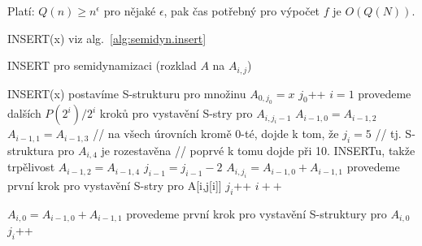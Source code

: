 Platí: $Q(n) \geq n^{\epsilon}$ pro nějaké $\epsilon$, pak čas potřebný pro
výpočet $f$ je $O(Q(N))$.

INSERT(x) viz alg.~\ref{alg:semidyn.insert}



\begin{algorithm}[!htb]
\caption{INSERT pro semidynamizaci (rozklad $A$ na $A_{i,j}$)}
\label{alg:semidyn.insert.vylepseny}
\begin{algorithmic}
\STATE INSERT(x)
  \STATE postavíme S-strukturu pro množinu $A_{0,j_0}={x}$
  \STATE $j_0$++
  \STATE $i=1$
      \STATE provedeme dalších $P(2^i)/2^i$ kroků pro vystavění 
      	S-stry pro $A_{i,j_i-1}$
        \STATE $A_{i-1,0}=A_{i-1,2}$
        \STATE $A_{i-1,1}=A_{i-1,3}$
          \STATE // na všech úrovních kromě 0-té, dojde k tom, že $j_i=5$
	  \STATE // tj. S-struktura pro $A_{i,4}$ je rozestavěna
          \STATE // poprvé k tomu dojde při 10. INSERTu, takže trpělivost
	  \STATE $A_{i-1,2}=A_{i-1,4}$
	\ENDIF
        \STATE $j_{i-1}=j_{i-1}-2$
        \STATE $A_{i,j_i}=A_{i-1,0} + A_{i-1,1}$
        \STATE provedeme první krok pro vystavění S-stry pro A[i,j[i]]
        \STATE $j_i$++
      \ENDIF
    \ENDIF
    \STATE $i++$
  \ENDWHILE

    \STATE $A_{i,0}=A_{i-1,0} + A_{i-1,1}$
    \STATE provedeme první krok pro vystavění S-struktury pro $A_{i,0}$
    \STATE $j_i$++
  \ENDIF
\ENDIF
\end{algorithmic}
\end{algorithm}

